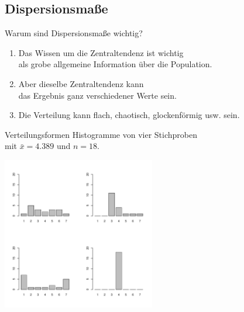 \subsection{Dispersionsmaße}

\begin{frame}
  {Warum sind Dispersionsmaße wichtig?}
  \begin{enumerate}[<+->]
    \item Das Wissen um die Zentraltendenz ist wichtig\\
      als grobe allgemeine Information über die Population.
    \item Aber dieselbe Zentraltendenz kann\\
      das Ergebnis ganz verschiedener Werte sein.
    \item Die Verteilung kann flach, chaotisch, glockenförmig usw. sein.
  \end{enumerate}
\end{frame}

\begin{frame}
  {Verteilungsformen}
  Histogramme von vier Stichproben\\
  mit $\bar{x}=4.389$ und $n=18$.
  \vspace{-0.5cm}
  \begin{center}
    \includegraphics[width=0.5\textwidth]{graphics/fourdists}
  \end{center}
\end{frame}

